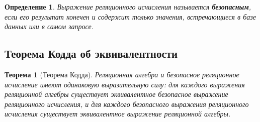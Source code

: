 \documentclass[12pt,a4paper]{article}
\newtheorem{definition}{Определение}[section]
\newtheorem{theorem}{Теорема}[section]
\theoremstyle{remark}
\begin{document}
\begin{definition}
Выражение реляционного исчисления называется \textbf{безопасным}, если его результат конечен и содержит только значения, встречающиеся в базе данных или в самом запросе.
\end{definition}

\subsection{Теорема Кодда об эквивалентности}

\begin{theorem}[Теорема Кодда]
Реляционная алгебра и безопасное реляционное исчисление имеют одинаковую выразительную силу: для каждого выражения реляционной алгебры существует эквивалентное безопасное выражение реляционного исчисления, и для каждого безопасного выражения реляционного исчисления существует эквивалентное выражение реляционной алгебры.
\end{theorem}
\end{document}
